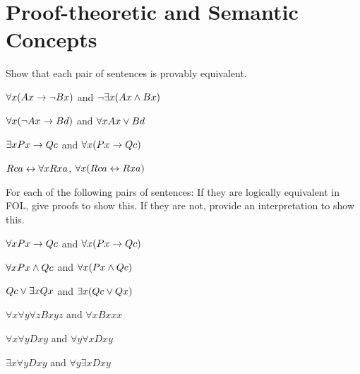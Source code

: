 \
\\

\chapter{Proof-theoretic and Semantic Concepts}\setcounter{ProbPart}{0}


\problempart
Show that each pair of sentences is provably equivalent.
\begin{earg}
\item $\forall x (Ax\rightarrow \neg Bx)$ and $\neg\exists x(Ax \wedge Bx)$
\item $\forall x (\neg Ax\rightarrow Bd)$ and $\forall x Ax \vee Bd$
\item $\exists x Px \rightarrow Qc$ and $\forall x (Px \rightarrow Qc)$
\item $Rca \leftrightarrow \forall x Rxa$, $\forall x(Rca \leftrightarrow Rxa)$
\end{earg}



\problempart
\label{pr.QLequivornot}
For each of the following pairs of sentences: If they are logically equivalent in FOL, give proofs to show this. If they are not, provide an interpretation to show this.
\begin{earg}
\item $\forall x Px \rightarrow Qc$ and $\forall x (Px \rightarrow Qc)$
\item $\forall x Px \wedge Qc$ and $\forall x (Px \wedge Qc)$
\item $Qc \vee \exists x Qx$ and $\exists x (Qc \vee Qx)$
\item $\forall x\forall y \forall z Bxyz$ and $\forall x Bxxx$
\item $\forall x\forall y Dxy$ and $\forall y\forall x Dxy$
\item $\exists x\forall y Dxy$ and $\forall y\exists x Dxy$
\end{earg}

